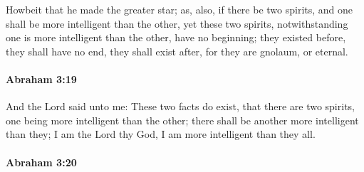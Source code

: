 			Howbeit that he made the greater star; as, also, if there be two spirits, and one shall be more intelligent than the other, yet these two spirits, notwithstanding one is more intelligent than the other, have no beginning; they existed before, they shall have no end, they shall exist after, for they are gnolaum, or eternal.


		\paragraph{Abraham 3:19} %
			\label{ABRAHAM-3-19}

			And the Lord said unto me: These two facts do exist, that there are two spirits, one being more intelligent than the other; there shall be another more intelligent than they; I am the Lord thy God, I am more intelligent than they all.


		\paragraph{Abraham 3:20} %
			\label{ABRAHAM-3-20}

